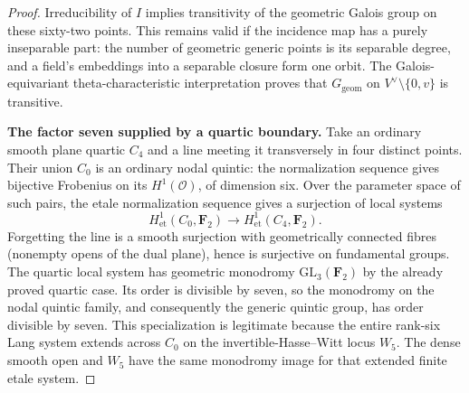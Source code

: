 \begin{proof}
Irreducibility of $I$ implies transitivity of the geometric Galois
group on these sixty-two points.  This remains valid if the incidence
map has a purely inseparable part: the number of geometric generic
points is its separable degree, and a field's embeddings into a
separable closure form one orbit.  The Galois-equivariant
theta-characteristic interpretation proves that
$G_{\mathrm{geom}}$ on $V^\vee\setminus\{0,v\}$ is transitive.

\par\smallskip\noindent\textbf{The factor seven supplied by a quartic boundary.}
Take an ordinary smooth plane quartic $C_4$ and a line meeting it
transversely in four distinct points.  Their union $C_0$ is an ordinary
nodal quintic: the normalization sequence gives bijective Frobenius
on its $H^1(\mathcal O)$, of dimension six.  Over the parameter space
of such pairs, the etale normalization sequence gives a surjection
of local systems
\[
 H^1_{\mathrm{et}}(C_0,\mathbf F_2)
 \longrightarrow H^1_{\mathrm{et}}(C_4,\mathbf F_2).
\]
Forgetting the line is a smooth surjection with geometrically
connected fibres (nonempty opens of the dual plane), hence is
surjective on fundamental groups.  The quartic local system has
geometric monodromy $\mathrm{GL}_3(\mathbf F_2)$ by the already proved
quartic case.  Its order is divisible by seven, so the monodromy on
the nodal quintic family, and consequently the generic quintic group,
has order divisible by seven.  This specialization is legitimate
because the entire rank-six Lang system extends across $C_0$ on the
invertible-Hasse--Witt locus $W_5$.  The dense smooth open and $W_5$
have the same monodromy image for that extended finite etale system.


\end{proof}
